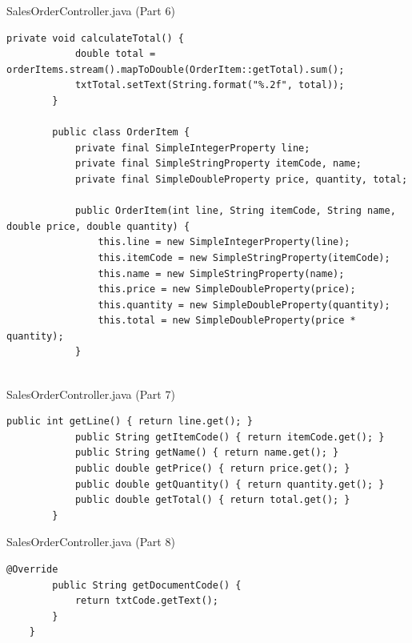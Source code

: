 \documentclass[aspectratio=169, table]{beamer}
\begin{document}
\begin{frame}[fragile]{SalesOrderController.java (Part 6)}
	\vspace{20pt}
	\begin{lstlisting}[style=JavaStyle]
		private void calculateTotal() {
			double total = orderItems.stream().mapToDouble(OrderItem::getTotal).sum();
			txtTotal.setText(String.format("%.2f", total));
		}
		
		public class OrderItem {
			private final SimpleIntegerProperty line;
			private final SimpleStringProperty itemCode, name;
			private final SimpleDoubleProperty price, quantity, total;
			
			public OrderItem(int line, String itemCode, String name, double price, double quantity) {
				this.line = new SimpleIntegerProperty(line);
				this.itemCode = new SimpleStringProperty(itemCode);
				this.name = new SimpleStringProperty(name);
				this.price = new SimpleDoubleProperty(price);
				this.quantity = new SimpleDoubleProperty(quantity);
				this.total = new SimpleDoubleProperty(price * quantity);
			}
			
		\end{lstlisting}
	\end{frame}
	
	\begin{frame}[fragile]{SalesOrderController.java (Part 7)}
		\vspace{20pt}
		\begin{lstlisting}[style=JavaStyle]
			public int getLine() { return line.get(); }
			public String getItemCode() { return itemCode.get(); }
			public String getName() { return name.get(); }
			public double getPrice() { return price.get(); }
			public double getQuantity() { return quantity.get(); }
			public double getTotal() { return total.get(); }
		}
	\end{lstlisting}
\end{frame}

\begin{frame}[fragile]{SalesOrderController.java (Part 8)}
	\vspace{20pt}
	\begin{lstlisting}[style=JavaStyle]
		@Override
		public String getDocumentCode() {
			return txtCode.getText();
		}
	}
\end{lstlisting}
\end{frame}
\end{document}
